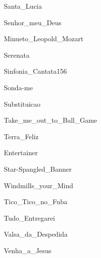 \documentclass{scrartcl}
\begin{document}

{Santa_Lucia}


{Senhor_meu_Deus}


{Minueto_Leopold_Mozart}


{Serenata}


{Sinfonia_Cantata156}


{Sonda-me}


{Substituicao}


{Take_me_out_to_Ball_Game}


{Terra_Feliz}


{Entertainer}


{Star-Spangled_Banner}


{Windmills_your_Mind}


{Tico_Tico_no_Fuba}


{Tudo_Entregarei}


{Valsa_da_Despedida}


{Venha_a_Jesus}
\end{document}
